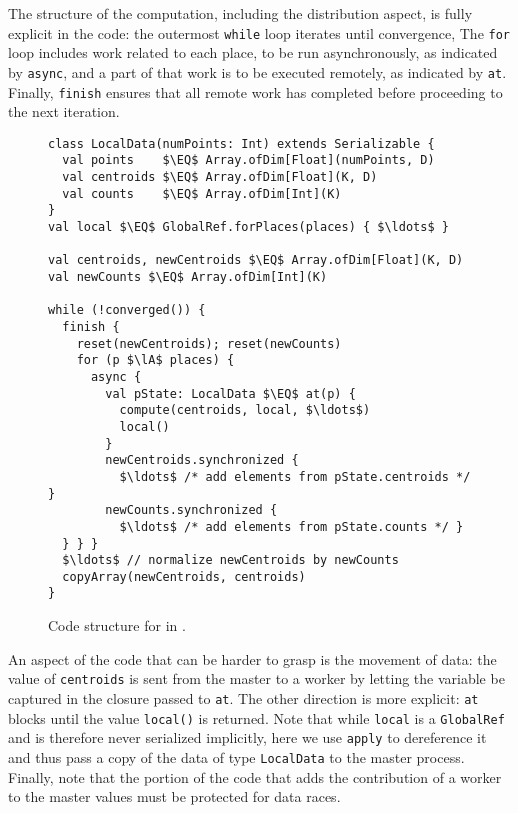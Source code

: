 The structure of the computation, including the distribution
aspect, is fully explicit in the code: the outermost \lstinline{while} loop
iterates until convergence, The \lstinline{for} loop includes work related to
each place, to be run asynchronously, as indicated by \lstinline{async}, and 
a part of that work is to be executed remotely, as indicated by \lstinline{at}.
Finally, \lstinline{finish} ensures that all remote work has completed before
proceeding to the next iteration.
\begin{figure}
\begin{lstlisting}
class LocalData(numPoints: Int) extends Serializable {
  val points    $\EQ$ Array.ofDim[Float](numPoints, D)
  val centroids $\EQ$ Array.ofDim[Float](K, D)
  val counts    $\EQ$ Array.ofDim[Int](K)
}
val local $\EQ$ GlobalRef.forPlaces(places) { $\ldots$ }

val centroids, newCentroids $\EQ$ Array.ofDim[Float](K, D)
val newCounts $\EQ$ Array.ofDim[Int](K)

while (!converged()) {
  finish {
    reset(newCentroids); reset(newCounts)
    for (p $\lA$ places) {
      async {
        val pState: LocalData $\EQ$ at(p) {
          compute(centroids, local, $\ldots$)
          local()
        }
        newCentroids.synchronized {
          $\ldots$ /* add elements from pState.centroids */ }
        newCounts.synchronized {
          $\ldots$ /* add elements from pState.counts */ }
  } } }
  $\ldots$ // normalize newCentroids by newCounts
  copyArray(newCentroids, centroids)
}
\end{lstlisting}
\caption{Code structure for \kmeans in \apgas.\label{fig:kmeansapgas}}
\end{figure}
An aspect of the code that can be harder to grasp is the movement of data: the
value of \lstinline{centroids} is sent from the master to a worker by letting
the variable be captured in the closure passed to \lstinline{at}. The other
direction is more explicit: \lstinline{at} blocks until the value
\lstinline{local()} is returned. Note that while \lstinline{local} is a
\lstinline{GlobalRef} and is therefore never serialized implicitly, here we use
\lstinline{apply} to dereference it and thus pass a copy of the data of type
\lstinline{LocalData} to the master process. Finally, note that the portion of
the code that adds the contribution of a worker to the master values must be
protected for data races.

